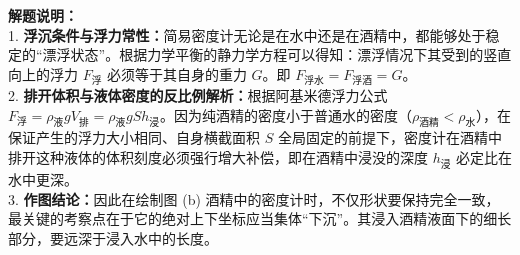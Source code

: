 \documentclass[12pt, a4paper]{ctexrep}
\begin{document}
\begin{center}
\end{center}

\vspace{0.6cm}

{\small\color{gray}
\textbf{解题说明：}\\
1. \textbf{浮沉条件与浮力常性：}简易密度计无论是在水中还是在酒精中，都能够处于稳定的“漂浮状态”。根据力学平衡的静力学方程可以得知：漂浮情况下其受到的竖直向上的浮力 $F_{\text{浮}}$ 必须等于其自身的重力 $G$。即 $F_{\text{浮水}} = F_{\text{浮酒}} = G$。\\
2. \textbf{排开体积与液体密度的反比例解析：}根据阿基米德浮力公式 $F_{\text{浮}} = \rho_{\text{液}} g V_{\text{排}} = \rho_{\text{液}} g S h_{\text{浸}}$。因为纯酒精的密度小于普通水的密度（$\rho_{\text{酒精}} < \rho_{\text{水}}$），在保证产生的浮力大小相同、自身横截面积 $S$ 全局固定的前提下，密度计在酒精中排开这种液体的体积刻度必须强行增大补偿，即在酒精中浸没的深度 $h_{\text{浸}}$ 必定比在水中更深。\\
3. \textbf{作图结论：}因此在绘制图 (b) 酒精中的密度计时，不仅形状要保持完全一致，最关键的考察点在于它的绝对上下坐标应当集体“下沉”。其浸入酒精液面下的细长部分，要远深于浸入水中的长度。
}

\vspace{0.6cm}
\end{document}
